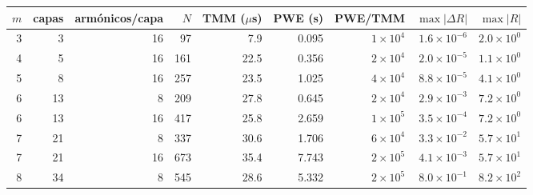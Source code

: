 \begin{tabular}{rrrrrrrrr}
\toprule
$m$ & capas & armónicos/capa & $N$ & TMM ($\mu$s) & PWE (s) & PWE/TMM & $\max|\Delta R|$ & $\max|R|$ \\
\midrule
3 & 3 & 16 & 97 & 7.9 & 0.095 & $1\times10^{4}$ & $1.6\times10^{-6}$ & $2.0\times10^{0}$ \\
4 & 5 & 16 & 161 & 22.5 & 0.356 & $2\times10^{4}$ & $2.0\times10^{-5}$ & $1.1\times10^{0}$ \\
5 & 8 & 16 & 257 & 23.5 & 1.025 & $4\times10^{4}$ & $8.8\times10^{-5}$ & $4.1\times10^{0}$ \\
6 & 13 & 8 & 209 & 27.8 & 0.645 & $2\times10^{4}$ & $2.9\times10^{-3}$ & $7.2\times10^{0}$ \\
6 & 13 & 16 & 417 & 25.8 & 2.659 & $1\times10^{5}$ & $3.5\times10^{-4}$ & $7.2\times10^{0}$ \\
7 & 21 & 8 & 337 & 30.6 & 1.706 & $6\times10^{4}$ & $3.3\times10^{-2}$ & $5.7\times10^{1}$ \\
7 & 21 & 16 & 673 & 35.4 & 7.743 & $2\times10^{5}$ & $4.1\times10^{-3}$ & $5.7\times10^{1}$ \\
8 & 34 & 8 & 545 & 28.6 & 5.332 & $2\times10^{5}$ & $8.0\times10^{-1}$ & $8.2\times10^{2}$ \\
\bottomrule
\end{tabular}
